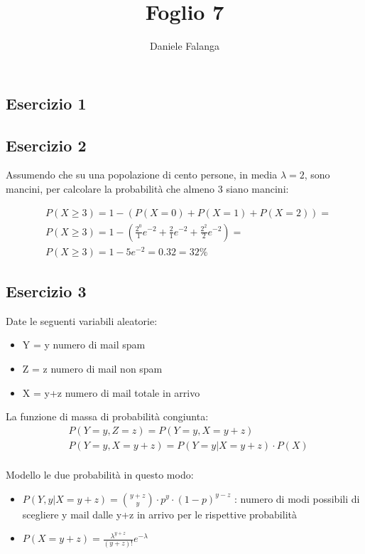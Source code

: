 \documentclass[12pt]{article}
\title{\textbf{Foglio 7}}
\author{Daniele Falanga}
\date{}
\begin{document}
\maketitle

\subsection*{Esercizio 1}

\subsection*{Esercizio 2}
Assumendo che su una popolazione di cento persone, in media \(\lambda = 2\), sono mancini, per calcolare la probabilità che almeno 3 siano mancini:

\begin{align*}
    &P(X \ge 3) = 1 - (P(X = 0) + P(X = 1) + P(X = 2)) = \\    
    &P(X \ge 3) = 1 - (\frac{2^0}{1}e^{-2} + \frac{2}{1}e^{-2} + \frac{2^2}{2}e^{-2}) = \\
    &P(X \ge 3) = 1-5e^{-2} = 0.32 = 32\%
\end{align*}  

\newpage
\subsection*{Esercizio 3}
Date le seguenti variabili aleatorie:
\begin{itemize}
    \item Y = y numero di mail spam 
    \item Z = z numero di mail non spam
    \item X = y+z numero di mail totale in arrivo  
\end{itemize}

La funzione di massa di probabilità congiunta:
\begin{align*}
    &P(Y=y, Z=z) = P(Y=y, X = y+z) \\
    &P(Y=y, X = y+z) = P(Y=y|X = y+z)\cdot P(X) \\    
\end{align*}

Modello le due probabilità in questo modo:
\begin{itemize}
    \item \(P(Y,y|X = y+z) = \binom{y+z}{y}\cdot p^y \cdot (1-p)^{y-z} \) : numero di modi possibili di scegliere y mail dalle y+z in arrivo per le rispettive probabilità
    \item \(P(X = y+z) = \frac{\lambda^{y+z}}{(y+z)!} e^{-\lambda}\)
\end{itemize}
\end{document}
